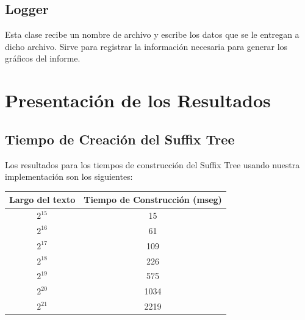 \documentclass[letterpaper,10pt]{article}
\begin{document}
	\subsection{Logger}

	Esta clase recibe un nombre de archivo y escribe los datos que se le entregan a dicho archivo. Sirve para registrar la información necesaria para generar los gráficos del informe.

	\newpage

	\section{Presentación de los Resultados}

	\subsection{Tiempo de Creación del Suffix Tree}

	Los resultados para los tiempos de construcción del Suffix Tree usando nuestra implementación son los siguientes:

	\begin{center}
		\begin{tabular}{|c|c|}
			\hline
			Largo del texto & Tiempo de Construcción (mseg)\\
			\hline
			$2^{15}$ & 15\\
			\hline
			$2^{16}$ & 61\\
			\hline
			$2^{17}$ & 109\\
			\hline
			$2^{18}$ & 226\\
			\hline
			$2^{19}$ & 575\\
			\hline
			$2^{20}$ & 1034\\
			\hline
			$2^{21}$ & 2219\\
			\hline
		\end{tabular}
	\end{center}
\end{document}
